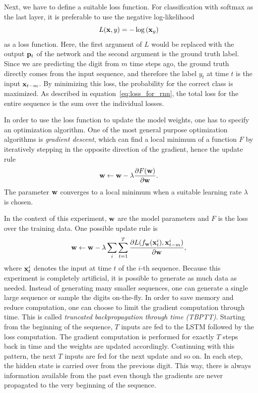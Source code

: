 		Next, we have to define a suitable loss function. 
		For classification with softmax as the last layer, it is preferable to use the negative log-likelihood
		\begin{equation}
			L(\mathbf{x}, y) = -\log\left(\mathbf{x}_y\right)
		\end{equation}
		as a loss function. 
		Here, the first argument of $L$ would be replaced with the output $\mathbf{p}_t$ of the network and the second argument is the ground truth label. 
		Since we are predicting the digit from $m$ time steps ago, the ground truth directly comes from the input sequence, and therefore the label $y_t$ at time $t$ is the input $\mathbf{x}_{t - m}$.
		By minimizing this loss, the probability for the correct class is maximized.
		As described in equation~\ref{eq:loss_for_rnn}, the total loss for the entire sequence is the sum over the individual losses.
		
		In order to use the loss function to update the model weights, one has to specify an optimization algorithm.
		One of the most general purpose optimization algorithms is \emph{gradient descent}, which can find a local minimum of a function $F$ by iteratively stepping in the opposite direction of the gradient, hence the update rule
		\begin{equation}
			\mathbf{w} \leftarrow 
			\mathbf{w} - \lambda \frac{\partial F(\mathbf{w})}{\partial \mathbf{w}}.
		\end{equation}
		The parameter $\mathbf{w}$ converges to a local minimum when a suitable learning rate $\lambda$ is chosen.
		
		In the context of this experiment, $\mathbf{w}$ are the model parameters and $F$ is the loss over the training data. 
		One possible update rule is
		\begin{equation}
			\mathbf{w} \leftarrow 
			\mathbf{w} - \lambda 
			\sum_{i}
			\sum_{t = 1}^{T}
			\frac{\partial L(f_{\mathbf{w}}(\mathbf{x}_t^{i}), \mathbf{x}_{t - m}^{i})}{\partial \mathbf{w}}, 
		\end{equation}
		where $\mathbf{x}_t^{i}$ denotes the input at time $t$ of the $i$-th sequence.
		Because this experiment is completely artificial, it is possible to generate as much data as needed.
		Instead of generating many smaller sequences, one can generate a single large sequence or sample the digits on-the-fly.
		In order to save memory and reduce computation, one can choose to limit the gradient computation through time.
		This is called \emph{truncated backpropagation through time (TBPTT)}. 
		Starting from the beginning of the sequence, $T$ inputs are fed to the LSTM followed by the loss computation.
		The gradient computation is performed for exactly $T$ steps back in time and the weights are updated accordingly. 
		Continuing with this pattern, the next $T$ inputs are fed for the next update and so on.
		In each step, the hidden state is carried over from the previous digit.
		This way, there is always information available from the past even though the gradients are never propagated to the very beginning of the sequence.
		
